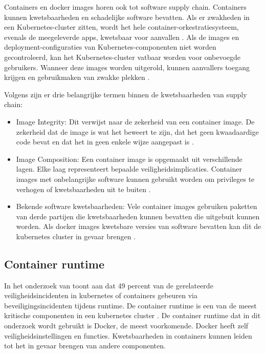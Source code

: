 Containers en docker images horen ook tot software supply chain. Containers kunnen kwetsbaarheden en schadelijke software bevatten. Als er zwakheden in een Kubernetes-cluster zitten, wordt het hele container-orkestratiesysteem, evenals de meegeleverde apps, kwetsbaar voor aanvallen \autocite{shamim2020xi}. Als de images en deployment-configuraties van Kubernetes-componenten niet worden gecontroleerd, kan het Kubernetes-cluster vatbaar worden voor onbevoegde gebruikers. Wanneer deze images worden uitgerold, kunnen aanvallers toegang krijgen en gebruikmaken van zwakke plekken \autocite{shamim2020xi}. \newline

Volgens \textcite{OWASP-2023} zijn er drie belangrijke termen binnen de kwetsbaarheden van supply chain:
\begin{itemize}
    \item Image Integrity: Dit verwijst naar de zekerheid van een container image. De zekerheid dat de image is wat het beweert te zijn, dat het geen kwaadaardige code bevat en dat het in geen enkele wijze aangepast is \autocite{OWASP-2023}. 
    \item Image Composition: Een container image is opgemaakt uit verschillende lagen. Elke laag representeert bepaalde veiligheidsimplicaties. Container images met onbelangrijke software kunnen gebruikt worden om privileges te verhogen of kwetsbaarheden uit te buiten \autocite{OWASP-2023}. 
    \item Bekende software kwetsbaarheden: Vele container images gebruiken paketten van derde partijen die kwetsbaarheden kunnen bevatten die uitgebuit kunnen worden. Als docker images kwetsbare versies van software bevatten kan dit de kubernetes cluster in gevaar brengen \autocite{OWASP-2023}. 
\end{itemize}


\subsection{Container runtime}
In het onderzoek van \textcite{red-hat-2023} toont aan dat 49 percent van de gerelateerde veiligheidsincidenten in kubernetes of containers gebeuren via beveiligingsincidenten tijdens runtime. De container runtime is een van de meest kritische componenten in een kubernetes cluster \autocite{mytilinakis2020attack}. De container runtime dat in dit onderzoek wordt gebruikt is Docker, de meest voorkomende. Docker heeft zelf veiligheidsinstellingen en functies. Kwetsbaarheden in containers kunnen leiden tot het in gevaar brengen van andere componenten. 

